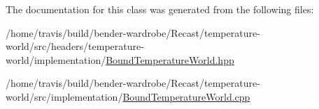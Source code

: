 The documentation for this class was generated from the following files\-:\begin{DoxyCompactItemize}
\item 
/home/travis/build/bender-\/wardrobe/\-Recast/temperature-\/world/src/headers/temperature-\/world/implementation/\hyperlink{_bound_temperature_world_8hpp}{Bound\-Temperature\-World.\-hpp}\item 
/home/travis/build/bender-\/wardrobe/\-Recast/temperature-\/world/src/implementation/\hyperlink{_bound_temperature_world_8cpp}{Bound\-Temperature\-World.\-cpp}\end{DoxyCompactItemize}
